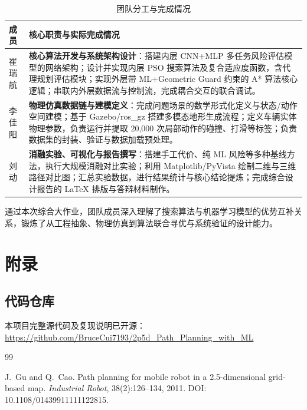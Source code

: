 \documentclass[12pt, a4paper]{article}
\begin{document}
\begin{table}[htbp]
    \centering
    \caption{团队分工与完成情况}
    \label{tab:contribution}
    \small
    \begin{tabular}{p{2.2cm} p{11.2cm}}
        \toprule
        \textbf{成员} & \textbf{核心职责与实际完成情况} \\
        \midrule
        崔瑞航 &
        \textbf{核心算法开发与系统架构设计}：搭建内层 CNN+MLP 多任务风险评估模型的网络架构；设计并实现内层 PSO 搜索算法及复合适应度函数，含代理规划评估模块；实现外层带 ML+Geometric Guard 约束的 A* 算法核心逻辑；串联内外层数据流与控制流，完成耦合交互的联合调试。 \\
        \midrule
        李佳阳 &
        \textbf{物理仿真数据链与建模定义}：完成问题场景的数学形式化定义与状态/动作空间建模；基于 Gazebo/ros\_gz 搭建多模态地形生成流程；定义车辆实体物理参数，负责运行并提取 20,000 次局部动作的碰撞、打滑等标签；负责数据集的封装、验证与数据加载预处理。 \\
        \midrule
        刘动 &
        \textbf{消融实验、可视化与报告撰写}：搭建手工代价、纯 ML 风险等多种基线方法，执行大规模消融对比实验；利用 Matplotlib/PyVista 绘制二维与三维路径对比图；汇总实验数据，进行结果统计与核心结论提炼；完成综合设计报告的 \LaTeX{} 排版与答辩材料制作。 \\
        \bottomrule
    \end{tabular}
\end{table}

通过本次综合大作业，团队成员深入理解了搜索算法与机器学习模型的优势互补关系，锻炼了从工程抽象、物理仿真到算法联合寻优与系统验证的设计能力。

\newpage
\section*{附录}

\subsection*{代码仓库}

本项目完整源代码及复现说明已开源：\url{https://github.com/BruceCui7193/2p5d_Path_Planning_with_ML}

\begin{thebibliography}{99}

J.~Gu and Q.~Cao.
\newblock Path planning for mobile robot in a 2.5-dimensional grid-based map.
\newblock \emph{Industrial Robot}, 38(2):126--134, 2011.
\newblock DOI: 10.1108/01439911111122815.

\end{thebibliography}
\end{document}
